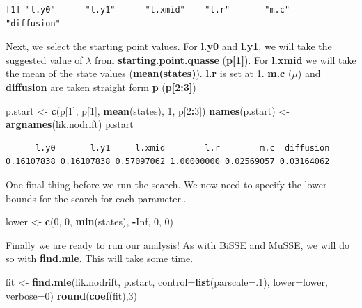 \documentclass[
]{book}
\newenvironment{Shaded}{\begin{snugshade}}{\end{snugshade}}
\newcommand{\DataTypeTok}[1]{\textcolor[rgb]{0.13,0.29,0.53}{#1}}
\newcommand{\DecValTok}[1]{\textcolor[rgb]{0.00,0.00,0.81}{#1}}
\newcommand{\KeywordTok}[1]{\textcolor[rgb]{0.13,0.29,0.53}{\textbf{#1}}}
\newcommand{\NormalTok}[1]{#1}
\newcommand{\OperatorTok}[1]{\textcolor[rgb]{0.81,0.36,0.00}{\textbf{#1}}}
\newcommand{\OtherTok}[1]{\textcolor[rgb]{0.56,0.35,0.01}{#1}}
\newcommand{\StringTok}[1]{\textcolor[rgb]{0.31,0.60,0.02}{#1}}
\begin{document}
\begin{verbatim}
[1] "l.y0"      "l.y1"      "l.xmid"    "l.r"       "m.c"       "diffusion"
\end{verbatim}

Next, we select the starting point values. For \textbf{l.y0} and \textbf{l.y1}, we will take the suggested value of \(\lambda\) from \textbf{starting.point.quasse} (\textbf{p{[}1{]}}). For \textbf{l.xmid} we will take the mean of the state values (\textbf{mean(states)}). \textbf{l.r} is set at 1. \textbf{m.c} (\(\mu\)) and \textbf{diffusion} are taken straight form \textbf{p} (\textbf{p{[}2:3{]}})

\begin{Shaded}
\begin{Highlighting}[]
\NormalTok{p.start \textless{}{-}}\StringTok{ }\KeywordTok{c}\NormalTok{(p[}\DecValTok{1}\NormalTok{], p[}\DecValTok{1}\NormalTok{], }\KeywordTok{mean}\NormalTok{(states), }\DecValTok{1}\NormalTok{, p[}\DecValTok{2}\OperatorTok{:}\DecValTok{3}\NormalTok{])}
\KeywordTok{names}\NormalTok{(p.start) \textless{}{-}}\StringTok{ }\KeywordTok{argnames}\NormalTok{(lik.nodrift)}
\NormalTok{p.start}
\end{Highlighting}
\end{Shaded}

\begin{verbatim}
      l.y0       l.y1     l.xmid        l.r        m.c  diffusion 
0.16107838 0.16107838 0.57097062 1.00000000 0.02569057 0.03164062 
\end{verbatim}

One final thing before we run the search. We now need to specify the lower bounds for the search for each parameter..

\begin{Shaded}
\begin{Highlighting}[]
\NormalTok{lower \textless{}{-}}\StringTok{ }\KeywordTok{c}\NormalTok{(}\DecValTok{0}\NormalTok{, }\DecValTok{0}\NormalTok{, }\KeywordTok{min}\NormalTok{(states), }\OperatorTok{{-}}\OtherTok{Inf}\NormalTok{, }\DecValTok{0}\NormalTok{, }\DecValTok{0}\NormalTok{)}
\end{Highlighting}
\end{Shaded}

Finally we are ready to run our analysis! As with BiSSE and MuSSE, we will do so with \textbf{find.mle}. This will take some time.

\begin{Shaded}
\begin{Highlighting}[]
\NormalTok{fit \textless{}{-}}\StringTok{ }\KeywordTok{find.mle}\NormalTok{(lik.nodrift, p.start, }
                \DataTypeTok{control=}\KeywordTok{list}\NormalTok{(}\DataTypeTok{parscale=}\NormalTok{.}\DecValTok{1}\NormalTok{), }
                \DataTypeTok{lower=}\NormalTok{lower, }\DataTypeTok{verbose=}\DecValTok{0}\NormalTok{)}
\KeywordTok{round}\NormalTok{(}\KeywordTok{coef}\NormalTok{(fit),}\DecValTok{3}\NormalTok{)}
\end{Highlighting}
\end{Shaded}
\end{document}
